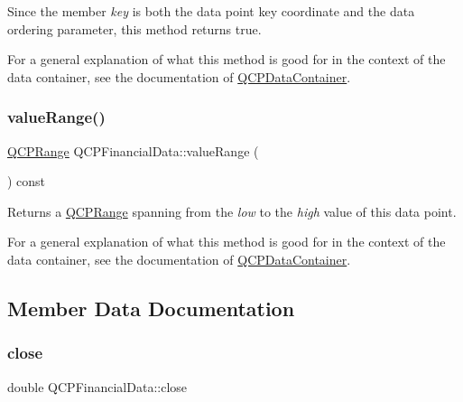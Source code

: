 Since the member {\itshape key} is both the data point key coordinate and the data ordering parameter, this method returns true.

For a general explanation of what this method is good for in the context of the data container, see the documentation of \mbox{\hyperlink{class_q_c_p_data_container}{Q\+C\+P\+Data\+Container}}. \mbox{\label{class_q_c_p_financial_data_a164d5584eeeb9ba48b4b595ac2ac7fcf}} 
\subsubsection{\texorpdfstring{valueRange()}{valueRange()}}
{\footnotesize\ttfamily \mbox{\hyperlink{class_q_c_p_range}{Q\+C\+P\+Range}} Q\+C\+P\+Financial\+Data\+::value\+Range (\begin{DoxyParamCaption}{ }\end{DoxyParamCaption}) const\hspace{0.3cm}{\ttfamily [inline]}}

Returns a \mbox{\hyperlink{class_q_c_p_range}{Q\+C\+P\+Range}} spanning from the {\itshape low} to the {\itshape high} value of this data point.

For a general explanation of what this method is good for in the context of the data container, see the documentation of \mbox{\hyperlink{class_q_c_p_data_container}{Q\+C\+P\+Data\+Container}}. 

\subsection{Member Data Documentation}
\mbox{\label{class_q_c_p_financial_data_a45e9b96944c4a08ea6c82a72d3d22df2}} 
\subsubsection{\texorpdfstring{close}{close}}
{\footnotesize\ttfamily double Q\+C\+P\+Financial\+Data\+::close}

\mbox{\label{class_q_c_p_financial_data_a299a4b241296fb6cd1baf5ab03f7126a}} 
